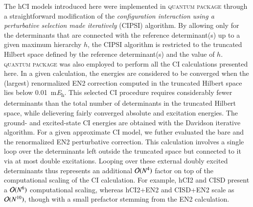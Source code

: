 \documentclass[aip,jcp,reprint,noshowkeys,superscriptaddress]{revtex4-1}
\newcommand{\QP}{\textsc{quantum package}}
\begin{document}
The hCI models introduced here were implemented in {\QP} \cite{Garniron_2019} through a straightforward modification of the
\textit{configuration interaction using a perturbative selection made iteratively} (CIPSI) algorithm. \cite{Huron_1973,Giner_2013,Giner_2015,Garniron_2018}
By allowing only for the determinants that are connected with the reference determinant(s) up to a given maximum hierarchy $h$,
the CIPSI algorithm is restricted to the truncated Hilbert space defined by the reference determinant(s) and the value of $h$.
{\QP} \cite{Garniron_2019} was also employed to perform all the CI calculations presented here.
In a given calculation, the energies are considered to be converged when the (largest) renormalized EN2 correction computed in the truncated Hilbert space 
lies below \SI{0.01}{\milli\hartree}. \cite{Garniron_2018}
This selected CI procedure requires considerably fewer determinants than the total number of determinants in the truncated Hilbert space,
while delievering fairly converged absolute and excitation energies.
The ground- and excited-state CI energies are obtained with the Davidson iterative algorithm. \cite{Davidson_1975}
For a given approximate CI model, we futher evaluated the bare and the renormalized EN2 perturbative correction. \cite{Garniron_2019} 
This calculation involves a single loop over the determinants left outside the truncated space but connected to it via at most double excitations.
Looping over these external doubly excited determinants thus represents an additional $\order*{N^4}$ factor on top of the computational scaling of the CI calculation.
For example, hCI2 and CISD present a $\order*{N^6}$ computational scaling, whereas hCI2+EN2 and CISD+EN2 scale as $\order*{N^{10}}$,
though with a small prefactor stemming from the EN2 calculation.
\end{document}
